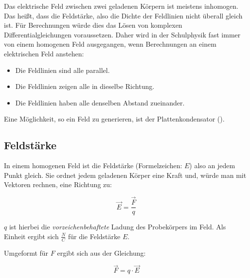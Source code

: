 Das elektrische Feld zwischen zwei geladenen Körpern ist meistens inhomogen. Das heißt, dass die Feldstärke, also die Dichte der Feldlinien nicht überall gleich ist. Für Berechnungen würde dies das Lösen von komplexen Differentialgleichungen voraussetzen. Daher wird in der Schulphysik fast immer von einem homogenen Feld ausgegangen, wenn Berechnungen an einem elektrischen Feld anstehen:

\begin{itemize}
	\item Die Feldlinien sind alle parallel.
	\item Die Feldlinien zeigen alle in dieselbe Richtung.
	\item Die Feldlinien haben alle denselben Abstand zueinander.
\end{itemize} 

\noindent Eine Möglichkeit, so ein Feld zu generieren, ist der Plattenkondensator ().


\subsection{Feldstärke}  \label{subsec:Feldstaerke}

In einem homogenen Feld ist die Feldstärke (Formelzeichen: $E$) also an jedem Punkt gleich. Sie ordnet jedem geladenen Körper eine Kraft und, würde man mit Vektoren rechnen, eine Richtung zu:

\begin{equation} \label{eq:feldstaerke}
	\vec{E} = \frac{\vec{F}}{q}
\end{equation}

\noindent $q$ ist hierbei die \emph{vorzeichenbehaftete} Ladung des Probekörpers im Feld. Als Einheit ergibt sich $\frac{N}{C}$ für die Feldstärke $E$. 

Umgeformt für $F$ ergibt sich aus der Gleichung:

\begin{equation} \label{eq:feldstaerke_nach_F}
	\vec{F} = q \cdot \vec{E}
\end{equation}









